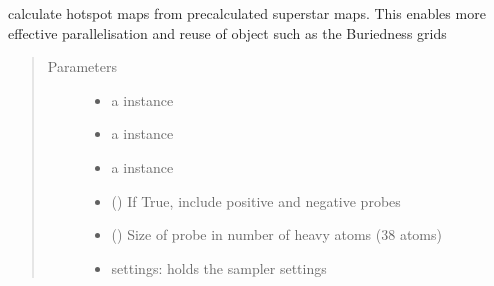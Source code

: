 \documentclass[letterpaper,10pt,english]{sphinxmanual}
\begin{document}
\begin{fulllineitems}
\begin{fulllineitems}
\end{fulllineitems}


\begin{fulllineitems}
\label{\detokenize{calculation_api:hotspots.calculation.Runner.from_superstar}}
calculate hotspot maps from precalculated superstar maps. This enables more effective parallelisation and reuse
of object such as the Buriedness grids
\begin{quote}\begin{description}
\item[{Parameters}] \leavevmode\begin{itemize}
\item {} 
 \textendash{} a  instance

\item {} 
 \textendash{} a  instance

\item {} 
 \textendash{} a  instance

\item {} 
 () \textendash{} If True, include positive and negative probes

\item {} 
 () \textendash{} Size of probe in number of heavy atoms (3\sphinxhyphen{}8 atoms)

\item {} 
 \textendash{}  settings: holds the sampler settings


\end{itemize}
\end{description}
\end{quote}
\end{fulllineitems}
\end{fulllineitems}
\end{document}

